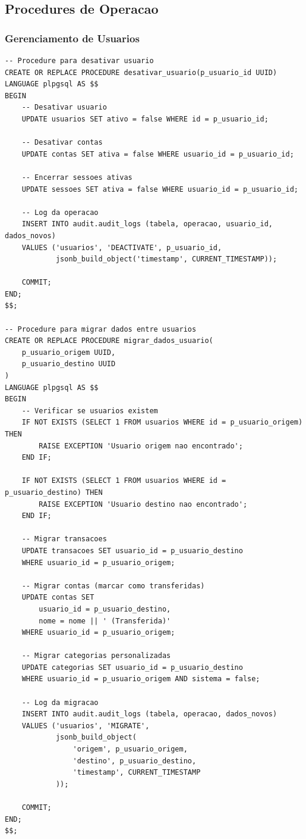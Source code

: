 \subsection{Procedures de Operacao}

\subsubsection{Gerenciamento de Usuarios}

\begin{lstlisting}[caption=Procedures para operacoes de usuario]
-- Procedure para desativar usuario
CREATE OR REPLACE PROCEDURE desativar_usuario(p_usuario_id UUID)
LANGUAGE plpgsql AS $$
BEGIN
    -- Desativar usuario
    UPDATE usuarios SET ativo = false WHERE id = p_usuario_id;
    
    -- Desativar contas
    UPDATE contas SET ativa = false WHERE usuario_id = p_usuario_id;
    
    -- Encerrar sessoes ativas
    UPDATE sessoes SET ativa = false WHERE usuario_id = p_usuario_id;
    
    -- Log da operacao
    INSERT INTO audit.audit_logs (tabela, operacao, usuario_id, dados_novos)
    VALUES ('usuarios', 'DEACTIVATE', p_usuario_id, 
            jsonb_build_object('timestamp', CURRENT_TIMESTAMP));
    
    COMMIT;
END;
$$;

-- Procedure para migrar dados entre usuarios
CREATE OR REPLACE PROCEDURE migrar_dados_usuario(
    p_usuario_origem UUID,
    p_usuario_destino UUID
)
LANGUAGE plpgsql AS $$
BEGIN
    -- Verificar se usuarios existem
    IF NOT EXISTS (SELECT 1 FROM usuarios WHERE id = p_usuario_origem) THEN
        RAISE EXCEPTION 'Usuario origem nao encontrado';
    END IF;
    
    IF NOT EXISTS (SELECT 1 FROM usuarios WHERE id = p_usuario_destino) THEN
        RAISE EXCEPTION 'Usuario destino nao encontrado';
    END IF;
    
    -- Migrar transacoes
    UPDATE transacoes SET usuario_id = p_usuario_destino 
    WHERE usuario_id = p_usuario_origem;
    
    -- Migrar contas (marcar como transferidas)
    UPDATE contas SET 
        usuario_id = p_usuario_destino,
        nome = nome || ' (Transferida)'
    WHERE usuario_id = p_usuario_origem;
    
    -- Migrar categorias personalizadas
    UPDATE categorias SET usuario_id = p_usuario_destino 
    WHERE usuario_id = p_usuario_origem AND sistema = false;
    
    -- Log da migracao
    INSERT INTO audit.audit_logs (tabela, operacao, dados_novos)
    VALUES ('usuarios', 'MIGRATE', 
            jsonb_build_object(
                'origem', p_usuario_origem,
                'destino', p_usuario_destino,
                'timestamp', CURRENT_TIMESTAMP
            ));
    
    COMMIT;
END;
$$;
\end{lstlisting}


